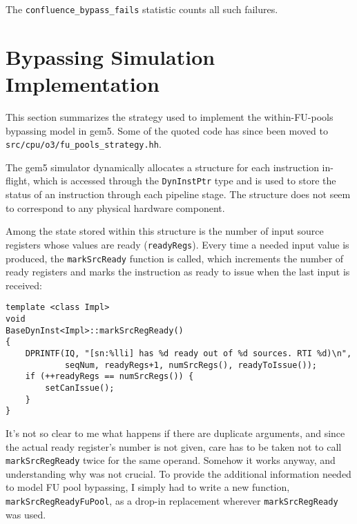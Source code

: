 \documentclass[11pt]{article}
\begin{document}
The \texttt{confluence\_bypass\_fails} statistic counts all such
failures.

\section{Bypassing Simulation Implementation}

This section summarizes the strategy used to implement the
within-FU-pools bypassing model in gem5. Some of the quoted code has
since been moved to \texttt{src/cpu/o3/fu\_pools\_strategy.hh}.

The gem5 simulator dynamically allocates a structure for each
instruction in-flight, which is accessed through the
\texttt{DynInstPtr} type and is used to store the status of
an instruction through each pipeline stage. The structure does
not seem to correspond to any physical hardware component.

Among the state stored within this structure is the number of
input source registers whose values are ready (\texttt{readyRegs}).
Every time a needed input value is produced, the \texttt{markSrcReady}
function is called, which increments the number of ready registers
and marks the instruction as ready to issue when the last input
is received:
\begin{verbatim}
template <class Impl>
void
BaseDynInst<Impl>::markSrcRegReady()
{
    DPRINTF(IQ, "[sn:%lli] has %d ready out of %d sources. RTI %d)\n",
            seqNum, readyRegs+1, numSrcRegs(), readyToIssue());
    if (++readyRegs == numSrcRegs()) {
        setCanIssue();
    }
}
\end{verbatim}
It's not so clear to me what happens if there are duplicate arguments,
and since the actual ready register's number is not given, care has to
be taken not to call \texttt{markSrcRegReady} twice for the same
operand. Somehow it works anyway, and understanding why was not
crucial. To provide the additional information needed to model
FU pool bypassing, I simply had to write a new function,
\texttt{markSrcRegReadyFuPool}, as a drop-in replacement wherever
\texttt{markSrcRegReady} was used.
\end{document}
